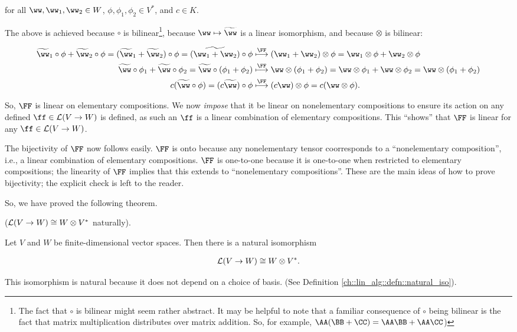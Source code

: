 \begin{deriv}
    for all $\ww, \ww_1, \ww_2 \in W$, $\phi, \phi_1, \phi_2 \in V^*$, and $c \in K$.
    
    The above is achieved because $\circ$ is bilinear\footnote{The fact that $\circ$ is bilinear might seem rather abstract. It may be helpful to note that a familiar consequence of $\circ$ being bilinear is the fact that matrix multiplication distributes over matrix addition. So, for example, $\AA(\BB + \CC) = \AA \BB + \AA \CC$)}, because $\ww \mapsto \tww$ is a linear isomorphism, and because $\otimes$ is bilinear:
    
    \begin{align*}
        \tww_1 \circ \phi + \tww_2 \circ \phi 
        = (\tww_1 + \tww_2) \circ \phi
        = \widetilde{(\ww_1 + \ww_2)} \circ \phi
        &\overset{\FF}{\longmapsto}
        (\ww_1 + \ww_2) \otimes \phi = \ww_1 \otimes \phi + \ww_2 \otimes \phi
        \\
        \tww \circ \phi_1 + \tww \circ \phi_2 
        = \tww \circ (\phi_1 + \phi_2)
        &\overset{\FF}{\longmapsto}
        \ww \otimes (\phi_1 + \phi_2)
        = \ww \otimes \phi_1 + \ww \otimes \phi_2
        = \ww \otimes (\phi_1 + \phi_2)
        \\
        c (\tww \circ \phi)
        = (c \tww) \circ \phi
        &\overset{\FF}{\longmapsto}
        (c \ww) \otimes \phi
        = c (\ww \otimes \phi).
    \end{align*}
    
    So, $\FF$ is linear on elementary compositions. We now \textit{impose} that it be linear on nonelementary compositions to ensure its action on any defined $\ff \in \LLLL(V \rightarrow W)$ is defined, as such an $\ff$ is a linear combination of elementary compositions. This ``shows'' that $\FF$ is linear for any $\ff \in \LLLL(V \rightarrow W)$.
    
    The bijectivity of $\FF$ now follows easily. $\FF$ is onto because any nonelementary tensor coorresponds to a ``nonelementary composition'', i.e., a linear combination of elementary compositions. $\FF$ is one-to-one because it is one-to-one when restricted to elementary compositions; the linearity of $\FF$ implies that this extends to ``nonelementary compositions''. These are the main ideas of how to prove bijectivity; the explicit check is left to the reader.
\end{deriv}

So, we have proved the following theorem.

\begin{theorem}
\label{ch::motivated_intro::thm::lin_V_W_iso_W_otimes_V}
    ($\mathcal{L}(V \rightarrow W) \cong W \otimes V^*$ naturally). 
    
    Let $V$ and $W$ be finite-dimensional vector spaces. Then there is a natural isomorphism
    
    \begin{align*}
        \mathcal{L}(V \rightarrow W) \cong W \otimes V^*.
    \end{align*}
    
    This isomorphism is natural because it does not depend on a choice of basis. (See Definition \ref{ch::lin_alg::defn::natural_iso}).
\end{theorem}

